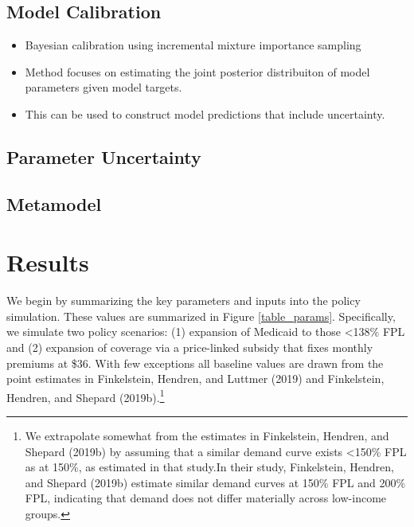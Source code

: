 \documentclass[
  10pt,
]{article}
\providecommand{\tightlist}{%
  \setlength{\itemsep}{0pt}\setlength{\parskip}{0pt}}
\begin{document}
\hypertarget{model-calibration}{%
\subsection{Model Calibration}\label{model-calibration}}

\begin{itemize}
\tightlist
\item
  Bayesian calibration using incremental mixture importance sampling
\item
  Method focuses on estimating the joint posterior distribuiton of model
  parameters given model targets.
\item
  This can be used to construct model predictions that include
  uncertainty.
\end{itemize}

\hypertarget{parameter-uncertainty}{%
\subsection{Parameter Uncertainty}\label{parameter-uncertainty}}

\hypertarget{metamodel}{%
\subsection{Metamodel}\label{metamodel}}

\hypertarget{results}{%
\section{Results}\label{results}}

We begin by summarizing the key parameters and inputs into the policy
simulation. These values are summarized in Figure \ref{table_params}.
Specifically, we simulate two policy scenarios: (1) expansion of
Medicaid to those \textless138\% FPL and (2) expansion of coverage via a
price-linked subsidy that fixes monthly premiums at \$36. With few
exceptions all baseline values are drawn from the point estimates in
Finkelstein, Hendren, and Luttmer (2019) and Finkelstein, Hendren, and
Shepard (2019b).\footnote{We extrapolate somewhat from the estimates in
  Finkelstein, Hendren, and Shepard (2019b) by assuming that a similar
  demand curve exists \textless150\% FPL as at 150\%, as estimated in
  that study.In their study, Finkelstein, Hendren, and Shepard (2019b)
  estimate similar demand curves at 150\% FPL and 200\% FPL, indicating
  that demand does not differ materially across low-income groups.}
\end{document}
